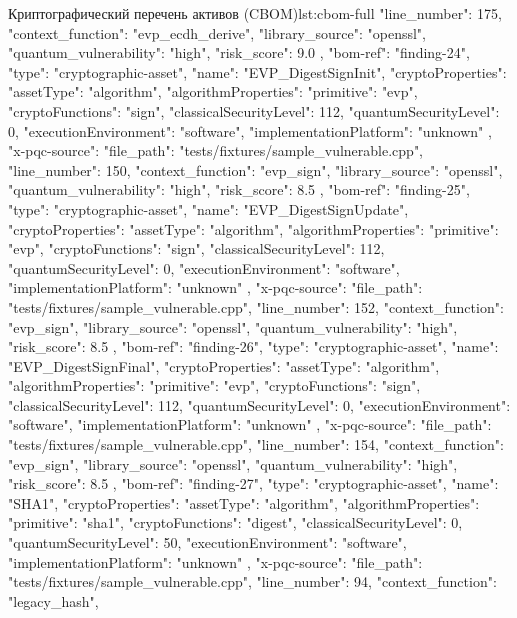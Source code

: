 \documentclass{itmo-vkr}
\begin{document}
\begin{itmolisting}[JSON]{Криптографический перечень активов (CBOM)}{lst:cbom-full}
{{{				"line_number": 175,
				"context_function": "evp_ecdh_derive",
				"library_source": "openssl",
				"quantum_vulnerability": "high",
				"risk_score": 9.0
			}
		},
		{
			"bom-ref": "finding-24",
			"type": "cryptographic-asset",
			"name": "EVP_DigestSignInit",
			"cryptoProperties": {
				"assetType": "algorithm",
				"algorithmProperties": {
					"primitive": "evp",
					"cryptoFunctions": "sign",
					"classicalSecurityLevel": 112,
					"quantumSecurityLevel": 0,
					"executionEnvironment": "software",
					"implementationPlatform": "unknown"
				}
			},
			"x-pqc-source": {
				"file_path": "tests/fixtures/sample_vulnerable.cpp",
				"line_number": 150,
				"context_function": "evp_sign",
				"library_source": "openssl",
				"quantum_vulnerability": "high",
				"risk_score": 8.5
			}
		},
		{
			"bom-ref": "finding-25",
			"type": "cryptographic-asset",
			"name": "EVP_DigestSignUpdate",
			"cryptoProperties": {
				"assetType": "algorithm",
				"algorithmProperties": {
					"primitive": "evp",
					"cryptoFunctions": "sign",
					"classicalSecurityLevel": 112,
					"quantumSecurityLevel": 0,
					"executionEnvironment": "software",
					"implementationPlatform": "unknown"
				}
			},
			"x-pqc-source": {
				"file_path": "tests/fixtures/sample_vulnerable.cpp",
				"line_number": 152,
				"context_function": "evp_sign",
				"library_source": "openssl",
				"quantum_vulnerability": "high",
				"risk_score": 8.5
			}
		},
		{
			"bom-ref": "finding-26",
			"type": "cryptographic-asset",
			"name": "EVP_DigestSignFinal",
			"cryptoProperties": {
				"assetType": "algorithm",
				"algorithmProperties": {
					"primitive": "evp",
					"cryptoFunctions": "sign",
					"classicalSecurityLevel": 112,
					"quantumSecurityLevel": 0,
					"executionEnvironment": "software",
					"implementationPlatform": "unknown"
				}
			},
			"x-pqc-source": {
				"file_path": "tests/fixtures/sample_vulnerable.cpp",
				"line_number": 154,
				"context_function": "evp_sign",
				"library_source": "openssl",
				"quantum_vulnerability": "high",
				"risk_score": 8.5
			}
		},
		{
			"bom-ref": "finding-27",
			"type": "cryptographic-asset",
			"name": "SHA1",
			"cryptoProperties": {
				"assetType": "algorithm",
				"algorithmProperties": {
					"primitive": "sha1",
					"cryptoFunctions": "digest",
					"classicalSecurityLevel": 0,
					"quantumSecurityLevel": 50,
					"executionEnvironment": "software",
					"implementationPlatform": "unknown"
				}
			},
			"x-pqc-source": {
				"file_path": "tests/fixtures/sample_vulnerable.cpp",
				"line_number": 94,
				"context_function": "legacy_hash",
}}}
\end{itmolisting}
\end{document}
